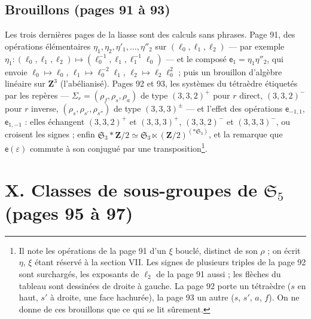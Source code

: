 \documentclass[11pt,a4paper]{article}
\begin{document}
\subsection*{Brouillons (pages 91 à 93)}

Les trois dernières pages de la liasse sont des calculs sans phrases. Page 91,
des opérations élémentaires $\eta_1, \eta_2, \eta'_1, \ldots, \eta''_2$ sur
$(\ell_0, \ell_1, \ell_2)$ --- par exemple $\eta_1 : (\ell_0, \ell_1, \ell_2) \mapsto
(\ell_0^{-1}, \ell_1, \ell_1^{-1}\ell_0)$ --- et le composé $\mathsf{e}_1 =
\eta_1\eta''_2$, qui envoie $\ell_0 \mapsto \ell_0$, $\ell_1 \mapsto
\ell_0^{-2}\ell_1$, $\ell_2 \mapsto \ell_2\ell_0^2$ ; puis un brouillon d'algèbre
linéaire sur $\mathbf{Z}^3$ (l'abélianisé). Pages 92 et 93, les systèmes du
tétraèdre étiquetés par les repères --- $\Sigma_r = (\rho_f, \rho_s, \rho_a)$ de
type $(3,3,2)^+$ pour $r$ direct, $(3,3,2)^-$ pour $r$ inverse, $(\rho_s,
\rho_{s'}, \rho_{s''})$ de type $(3,3,3)^\pm$ --- et l'effet des opérations
$\mathsf{e}_{-1,1}$, $\mathsf{e}_{1,-1}$ : elles échangent $(3,3,2)^+$ et
$(3,3,3)^+$, $(3,3,2)^-$ et $(3,3,3)^-$, ou croisent les signes ; enfin
$\mathfrak{S}_3 * \mathbf{Z}/2 \simeq \mathfrak{S}_3 \ltimes
(\mathbf{Z}/2)^{(*\mathfrak{S}_3)}$, et la remarque que $\mathsf{e}(\varepsilon)$
commute à son conjugué par une transposition\footnote{Il note les opérations de
la page 91 d'un $\xi$ bouclé, distinct de son $\rho$ ; on écrit $\eta$, $\xi$ étant
réservé à la section VII. Les signes de plusieurs triples de la page 92 sont
surchargés, les exposants de $\ell_2$ de la page 91 aussi ; les flèches du
tableau sont dessinées de droite à gauche. La page 92 porte un tétraèdre
($s$ en haut, $s'$ à droite, une face hachurée), la page 93 un autre ($s$, $s'$,
$a$, $f$). On ne donne de ces brouillons que ce qui se lit sûrement.}.

\section*{X. Classes de sous-groupes de $\mathfrak{S}_5$ (pages 95 à 97)}
\end{document}
